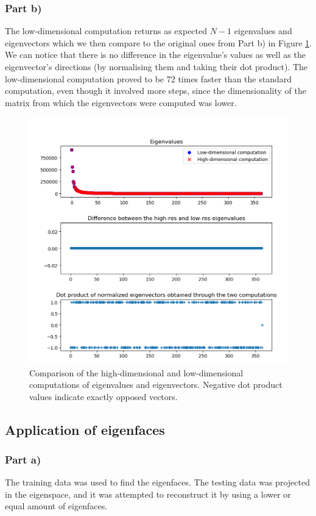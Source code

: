 \documentclass[10pt,technote]{IEEEtran}
\begin{document}
\subsubsection{Part b)}
The low-dimensional computation returns as expected $N - 1$ eigenvalues and eigenvectors which we then compare to the original ones from Part b) in Figure \ref{fig:eig_diff1}. We can notice that there is no difference in the eigenvalue's values as well as the eigenvector's directions (by normalising them and taking their dot product). 
The low-dimensional computation proved to be 72 times faster than the standard computation, even though it involved more steps, since the dimensionality of the matrix from which the eigenvectors were computed was lower. 
\begin{figure}[htb!]
    \centering
    \includegraphics[width=\linewidth]{../results/ex1b/DIfference_eig.png}
    \caption{Comparison of the high-dimensional and low-dimensional computations of eigenvalues and eigenvectors. Negative dot product values indicate exactly opposed vectors.}
    \label{fig:eig_diff1}
\end{figure}

\subsection{Application of eigenfaces}
\subsubsection{Part a)}
The training data was used to find the eigenfaces. The testing data was projected in the eigenspace, and it was attempted to reconstruct it by using a lower or equal amount of eigenfaces.
\end{document}
